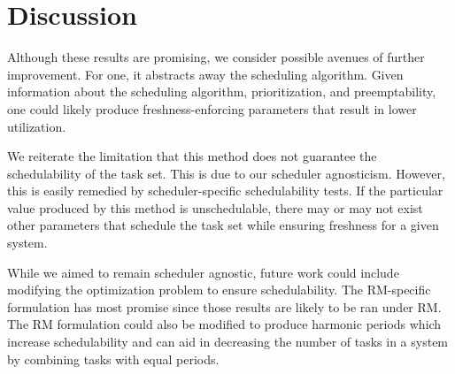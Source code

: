 \section{Discussion}

Although these results are promising, we consider possible avenues of further improvement. For one, it abstracts away the scheduling algorithm. Given information about the scheduling algorithm, prioritization, and preemptability, one could likely produce freshness-enforcing parameters that result in lower utilization.

We reiterate the limitation that this method does not guarantee the schedulability of the task set. This is due to our scheduler agnosticism. However, this is easily remedied by scheduler-specific schedulability tests. If the particular value produced by this method is unschedulable, there may or may not exist other parameters that schedule the task set while ensuring freshness for a given system.

While we aimed to remain scheduler agnostic, future work could include modifying the optimization problem to ensure schedulability. The RM-specific formulation has most promise since those results are likely to be ran under RM. The RM formulation could also be modified to produce harmonic periods which increase schedulability and can aid in decreasing the number of tasks in a system by combining tasks with equal periods.